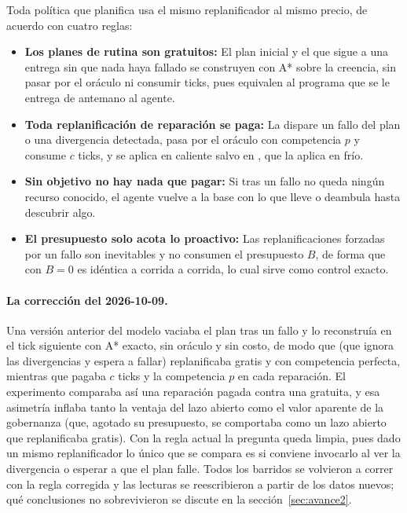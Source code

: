 Toda política que planifica usa el mismo replanificador al mismo precio, de acuerdo con cuatro reglas:

\begin{itemize}[leftmargin=1.4em, itemsep=0.2em]
  \item \textbf{Los planes de rutina son gratuitos:} El plan inicial y el que sigue a una entrega sin que nada haya fallado se construyen con A* sobre la creencia, sin pasar por el oráculo ni consumir ticks, pues equivalen al programa que se le entrega de antemano al agente.
  \item \textbf{Toda replanificación de reparación se paga:} La dispare un fallo del plan o una divergencia detectada, pasa por el oráculo con competencia $p$ y consume $c$ ticks, y se aplica en caliente salvo en \CR, que la aplica en frío.
  \item \textbf{Sin objetivo no hay nada que pagar:} Si tras un fallo no queda ningún recurso conocido, el agente vuelve a la base con lo que lleve o deambula hasta descubrir algo.
  \item \textbf{El presupuesto solo acota lo proactivo:} Las replanificaciones forzadas por un fallo son inevitables y no consumen el presupuesto $B$, de forma que con $B=0$ \GOV{} es idéntica a \OL{} corrida a corrida, lo cual sirve como control exacto.
\end{itemize}

\paragraph{La corrección del 2026-10-09.} Una versión anterior del modelo vaciaba el plan tras un fallo y lo reconstruía en el tick siguiente con A* exacto, sin oráculo y sin costo, de modo que \OL{} (que ignora las divergencias y espera a fallar) replanificaba gratis y con competencia perfecta, mientras que \CL{} pagaba $c$ ticks y la competencia $p$ en cada reparación. El experimento comparaba así una reparación pagada contra una gratuita, y esa asimetría inflaba tanto la ventaja del lazo abierto como el valor aparente de la gobernanza (que, agotado su presupuesto, se comportaba como un lazo abierto que replanificaba gratis). Con la regla actual la pregunta queda limpia, pues dado un mismo replanificador lo único que se compara es si conviene invocarlo al ver la divergencia o esperar a que el plan falle. Todos los barridos se volvieron a correr con la regla corregida y las lecturas se reescribieron a partir de los datos nuevos; qué conclusiones no sobrevivieron se discute en la sección~\ref{sec:avance2}.

